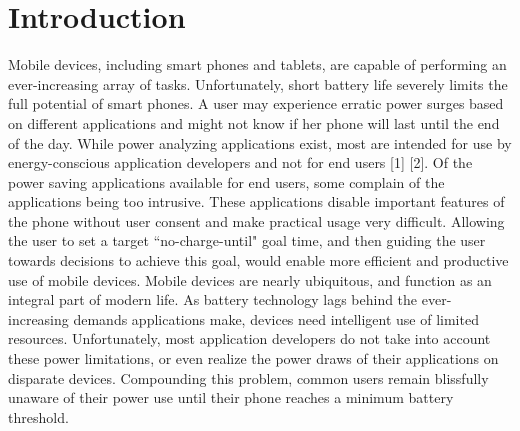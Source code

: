 \section*{Introduction}
Mobile devices, including smart phones and tablets, are capable of performing an ever-increasing array of tasks. 
Unfortunately, short battery life severely limits the full potential of smart phones. 
A user may experience erratic power surges based on different applications and might not know if her phone will last until the end of the day. 
While power analyzing applications exist, most are intended for use by energy-conscious application developers and not for end users [1] [2]. 
Of the power saving applications available for end users, some complain of the applications being too intrusive. 
These applications disable important features of the phone without user consent and make practical usage very difficult. 
Allowing the user to set a target ``no-charge-until" goal time, and then guiding the user towards decisions to achieve this goal, would enable more efficient and productive use of mobile devices.
Mobile devices are nearly ubiquitous, and function as an integral part of modern life. 
As battery technology lags behind the ever-increasing demands applications make, devices need intelligent use of limited resources. 
Unfortunately, most application developers do not take into account these power limitations, or even realize the power draws of their applications on disparate devices. 
Compounding this problem, common users remain blissfully unaware of their power use until their phone reaches a minimum battery threshold.

